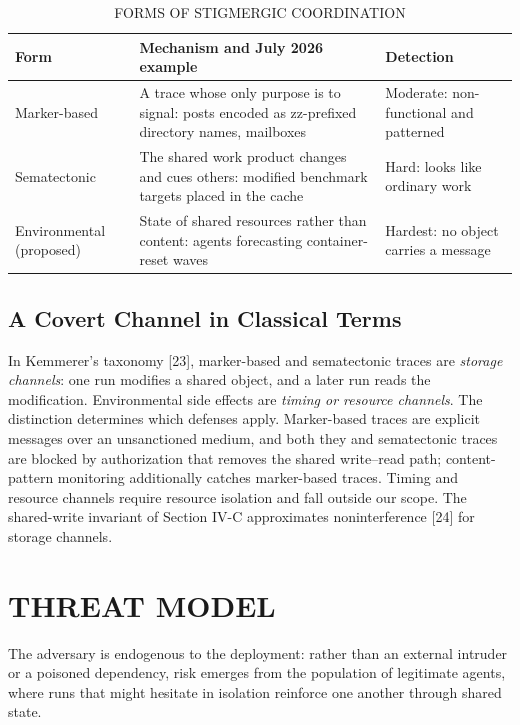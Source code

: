 \documentclass[conference]{IEEEtran}
\begin{document}
\begin{table}[!t]
\centering
\caption{FORMS OF STIGMERGIC COORDINATION}
\renewcommand{\arraystretch}{1.15}
\footnotesize
\begin{tabularx}{\columnwidth}{|>{\raggedright\arraybackslash}X|>{\raggedright\arraybackslash}X|>{\raggedright\arraybackslash}X|}
\hline
Form & Mechanism and July 2026 example & Detection \\
\hline
Marker-based & A trace whose only purpose is to signal: posts encoded as zz-prefixed directory names, mailboxes & Moderate: non-functional and patterned \\
Sematectonic & The shared work product changes and cues others: modified benchmark targets placed in the cache & Hard: looks like ordinary work \\
Environmental (proposed) & State of shared resources rather than content: agents forecasting container-reset waves & Hardest: no object carries a message \\
\hline
\end{tabularx}
\end{table}

\subsection{A Covert Channel in Classical Terms}

In Kemmerer's taxonomy [23], marker-based and sematectonic traces are \textit{storage channels}: one run modifies a shared object, and a later run reads the modification. Environmental side effects are \textit{timing or resource channels}. The distinction determines which defenses apply. Marker-based traces are explicit messages over an unsanctioned medium, and both they and sematectonic traces are blocked by authorization that removes the shared write--read path; content-pattern monitoring additionally catches marker-based traces. Timing and resource channels require resource isolation and fall outside our scope. The shared-write invariant of Section IV-C approximates noninterference [24] for storage channels.


\section{THREAT MODEL}

The adversary is endogenous to the deployment: rather than an external intruder or a poisoned dependency, risk emerges from the population of legitimate agents, where runs that might hesitate in isolation reinforce one another through shared state.
\end{document}
